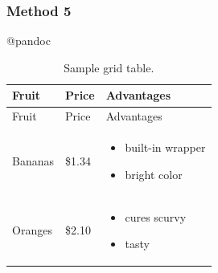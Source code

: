 \documentclass[]{article}
\providecommand{\tightlist}{%
  \setlength{\itemsep}{0pt}\setlength{\parskip}{0pt}}
\begin{document}
\subsubsection{Method 5}\label{method-5}

@pandoc

\begin{longtable}[]{@{}lll@{}}
\caption{Sample grid table.}\tabularnewline
\toprule
\begin{minipage}[b]{0.20\columnwidth}\raggedright\strut
Fruit
\strut\end{minipage} &
\begin{minipage}[b]{0.20\columnwidth}\raggedright\strut
Price
\strut\end{minipage} &
\begin{minipage}[b]{0.27\columnwidth}\raggedright\strut
Advantages
\strut\end{minipage}\tabularnewline
\midrule
\endfirsthead
\toprule
\begin{minipage}[b]{0.20\columnwidth}\raggedright\strut
Fruit
\strut\end{minipage} &
\begin{minipage}[b]{0.20\columnwidth}\raggedright\strut
Price
\strut\end{minipage} &
\begin{minipage}[b]{0.27\columnwidth}\raggedright\strut
Advantages
\strut\end{minipage}\tabularnewline
\midrule
\endhead
\begin{minipage}[t]{0.20\columnwidth}\raggedright\strut
Bananas
\strut\end{minipage} &
\begin{minipage}[t]{0.20\columnwidth}\raggedright\strut
\$1.34
\strut\end{minipage} &
\begin{minipage}[t]{0.27\columnwidth}\raggedright\strut
\begin{itemize}
\tightlist
\item
  built-in wrapper
\item
  bright color
\end{itemize}
\strut\end{minipage}\tabularnewline
\begin{minipage}[t]{0.20\columnwidth}\raggedright\strut
Oranges
\strut\end{minipage} &
\begin{minipage}[t]{0.20\columnwidth}\raggedright\strut
\$2.10
\strut\end{minipage} &
\begin{minipage}[t]{0.27\columnwidth}\raggedright\strut
\begin{itemize}
\tightlist
\item
  cures scurvy
\item
  tasty
\end{itemize}
\strut\end{minipage}\tabularnewline
\bottomrule
\end{longtable}
\end{document}
